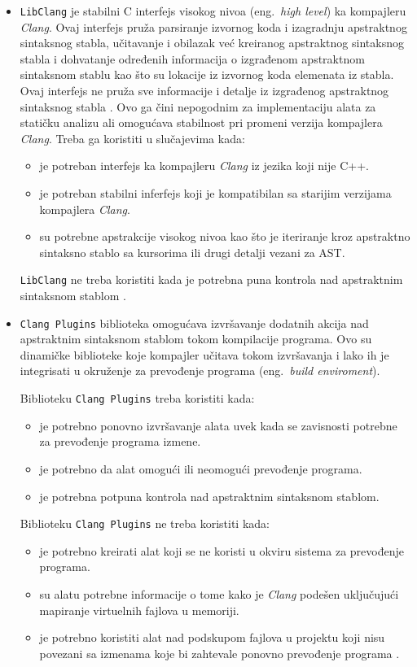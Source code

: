 \documentclass[12pt,oneside]{memoir}
\begin{document}
\begin{itemize}
\item \texttt{LibClang} je stabilni C interfejs visokog nivoa  (eng.~\textit{high level}) ka kompajleru \textit{Clang}. Ovaj interfejs pru\v{z}a parsiranje izvornog koda
i izagradnju apstraktnog sintaksnog stabla, u\v{c}itavanje i obilazak ve\'{c} kreiranog apstraktnog sintaksnog stabla i dohvatanje određenih informacija o izgrađenom apstraktnom sintaksnom stablu kao \v{s}to su lokacije iz izvornog koda elemenata iz stabla. Ovaj interfejs ne pru\v{z}a sve informacije i detalje iz izgrađenog apstraktnog sintaksnog stabla \cite{LibClang}. Ovo ga \v{c}ini nepogodnim za implementaciju alata za stati\v{c}ku analizu ali omogu\'{c}ava stabilnost pri promeni verzija kompajlera \textit{Clang}.
Treba ga koristiti u slu\v{c}ajevima kada:
\begin{itemize}
  \item je potreban interfejs ka kompajleru \textit{Clang} iz jezika koji nije C++.
  \item je potreban stabilni inferfejs koji je kompatibilan sa starijim verzijama kompajlera \textit{Clang}.
  \item su potrebne apstrakcije visokog nivoa kao \v{s}to je iteriranje kroz apstraktno sintaksno stablo sa kursorima ili drugi detalji vezani za AST.
\end{itemize}
\texttt{LibClang} ne treba koristiti kada je potrebna puna kontrola nad apstraktnim sintaksnom stablom \cite{RightInterface}.

\item \texttt{Clang Plugins} biblioteka omogu\'{c}ava izvr\v{s}avanje dodatnih akcija nad apstraktnim sintaksnom stablom tokom kompilacije programa. Ovo su dinami\v{c}ke biblioteke koje kompajler u\v{c}itava tokom izvr\v{s}avanja i lako ih je integrisati u okru\v{z}enje za prevođenje programa (eng.~\textit{build enviroment}).

Biblioteku \texttt{Clang Plugins} treba koristiti kada:

\begin{itemize}
\item je potrebno ponovno izvr\v{s}avanje alata uvek kada se zavisnosti potrebne za prevođenje programa izmene.
\item je potrebno da alat omogu\'{c}i ili neomogu\'{c}i prevođenje programa.
\item je potrebna potpuna kontrola nad apstraktnim sintaksnom stablom.
\end{itemize}
Biblioteku \texttt{Clang Plugins} ne treba koristiti kada:
\begin{itemize}
\item je potrebno kreirati alat koji se ne koristi u okviru sistema za prevođenje programa.
\item su alatu potrebne informacije o tome kako je \textit{Clang} pode\v{s}en uklju\v{c}uju\'{c}i mapiranje virtuelnih fajlova u memoriji.
\item je potrebno koristiti alat nad podskupom fajlova u projektu koji nisu povezani sa izmenama koje bi zahtevale ponovno prevođenje programa \cite{RightInterface}.
\end{itemize}


\end{itemize}
\end{document}
